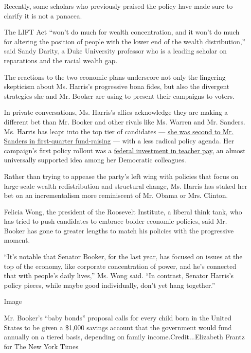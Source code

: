 Recently, some scholars who previously praised the policy have made sure
to clarify it is not a panacea.

The LIFT Act ``won't do much for wealth concentration, and it won't do
much for altering the position of people with the lower end of the
wealth distribution,'' said Sandy Darity, a Duke University professor
who is a leading scholar on reparations and the racial wealth gap.

The reactions to the two economic plans underscore not only the
lingering skepticism about Ms. Harris's progressive bona fides, but also
the divergent strategies she and Mr. Booker are using to present their
campaigns to voters.

In private conversations, Ms. Harris's allies acknowledge they are
making a different bet than Mr. Booker and other rivals like Ms. Warren
and Mr. Sanders. Ms. Harris has leapt into the top tier of candidates
---
\href{https://www.nytimes.com/interactive/2019/us/politics/campaign-finance-2020-fundraising.html}{she
was second to Mr. Sanders in first-quarter fund-raising} --- with a less
radical policy agenda. Her campaign's first policy rollout was a
\href{https://www.nytimes.com/2019/03/26/us/politics/kamala-harris-teacher-pay.html}{federal
investment in teacher pay}, an almost universally supported idea among
her Democratic colleagues.

Rather than trying to appease the party's left wing with policies that
focus on large-scale wealth redistribution and structural change, Ms.
Harris has staked her bet on an incrementalism more reminiscent of Mr.
Obama or Mrs. Clinton.

Felicia Wong, the president of the Roosevelt Institute, a liberal think
tank, who has tried to push candidates to embrace bolder economic
policies, said Mr. Booker has gone to greater lengths to match his
policies with the progressive moment.

``It's notable that Senator Booker, for the last year, has focused on
issues at the top of the economy, like corporate concentration of power,
and he's connected that with people's daily lives,'' Ms. Wong said. ``In
contrast, Senator Harris's policy pieces, while maybe good individually,
don't yet hang together.''

Image

Mr. Booker's ``baby bonds'' proposal calls for every child born in the
United States to be given a \$1,000 savings account that the government
would fund annually on a tiered basis, depending on family
income.Credit...Elizabeth Frantz for The New York Times

